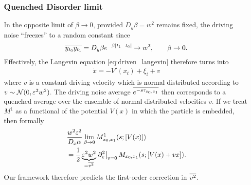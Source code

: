 \documentclass[%
 reprint,
superscriptaddress,
nofootinbib,
 amsmath,amssymb,
 aps,
prx,
]{revtex4-2}
\begin{document}
\subsubsection{Quenched Disorder limit}
In the opposite limit of $\beta \to 0$, provided $D_y\beta=w^2$ remains fixed, the driving noise ``freezes'' to a random constant since
\begin{align}
    \overline{y_{t_0}y_{t_1}} = D_y \beta e^{-\beta|t_1-t_0|} \to w^2, \qquad \beta \to 0.
\end{align}
Effectively, the Langevin equation \eqref{eq:driven_langevin} therefore turns into 
\begin{align}
    \dot{x} = -V'(x_t) +\xi_t +  v
    \label{eq:quenched_langevin}
\end{align}
 where $v$ is a constant driving velocity which is normal distributed according to $v \sim \mathcal{N}(0, \varepsilon^2 w^2)$. The driving noise average $\overline{e^{-s \tau_{x_0,x_1}}}$ then corresponds to a quenched average over the ensemble of normal distributed velocities $v$. If we treat  $M^1$ as a functional of the potential $V(x)$ in which the particle is embedded, then  formally
 \begin{align}
     &\frac{w^2 \varepsilon^2}{D_x \alpha}\lim_{\beta \to 0} M^1_{x_0, x_1}(s;[V(x)]) \\
     &= \frac12 \underbrace{\varepsilon^2 w^2}_{=\overline{v^2}} \left. \partial_v^2 \right|_{v=0} M_{x_0, x_1}(s;[V(x) + vx]).
     \label{eq:quenched_mgf_are_the_same}
 \end{align}
Our framework therefore predicts the first-order correction in $\overline{v^2}$.
\end{document}
